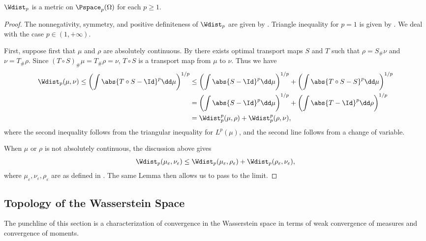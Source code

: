 \documentclass[oneside,reqno,letterpaper]{amsart}
\begin{document}
\begin{theorem}
  \(\Wdist_p\) is a metric on \(\Pspace_p(\Omega)\) for each \(p \geq 1\).
\end{theorem}
\begin{proof}
  The nonnegativity, symmetry, and positive definiteness of \(\Wdist_p\) are given by .
  Triangle inequality for \(p = 1\) is given by .
  We deal with the case \(p \in (1, +\infty)\).

  First, suppose first that \(\mu\) and \(\rho\) are absolutely continuous.
  By  there exists optimal transport maps \(S\) and \(T\) such that \(\rho = S_{\#} \nu\) and \(\nu = T_{\#} \rho\).
  Since \((T \circ S)_{\#} \mu = T_{\#} \rho = \nu\), \(T \circ S\) is a transport map from \(\mu\) to \(\nu\).
  Thus we have
  \begin{align*}
    \Wdist_p(\mu, \nu)
    \leq \left( \int \abs{T \circ S - \Id}^p \dd \mu \right)^{1 / p}
    &\leq \left( \int \abs{S - \Id}^p \dd \mu \right)^{1 / p} + \left( \int \abs{T \circ S - S}^p \dd \mu \right)^{1 / p} \\
    &= \left( \int \abs{S - \Id}^p \dd \mu \right)^{1 / p} + \left( \int \abs{T - \Id}^p \dd \rho \right)^{1 / p} \\
    &= \Wdist_p^p(\mu, \rho) + \Wdist_p^p(\rho, \nu),
  \end{align*}
  where the second inequality follows from the triangular inequality for \(L^p(\mu)\), and the second line follows from a change of variable.

  When \(\mu\) or \(\rho\) is not absolutely continuous, the discussion above gives
  \[
    \Wdist_p(\mu_{\varepsilon}, \nu_{\varepsilon})
    \leq \Wdist_p(\mu_{\varepsilon}, \rho_{\varepsilon}) + \Wdist_p(\rho_{\varepsilon}, \nu_{\varepsilon}),
  \]
  where \(\mu_{\varepsilon}, \nu_{\varepsilon}, \rho_{\varepsilon}\) are as defined in .
  The same Lemma then allows us to pass to the limit.
\end{proof}


\subsection{Topology of the Wasserstein Space}
The punchline of this section is a characterization of convergence in the Wasserstein space in terms of weak convergence of measures and convergence of moments.
\end{document}
